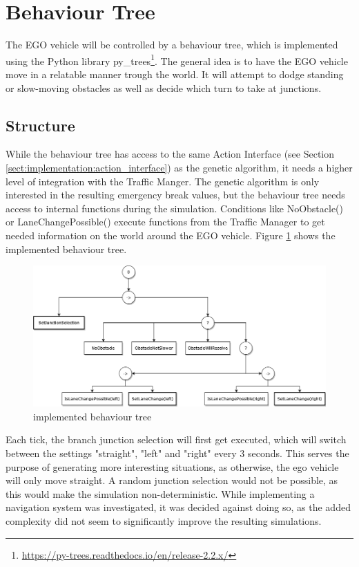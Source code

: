 \section{Behaviour Tree}
The EGO vehicle will be controlled by a behaviour tree, which is implemented using the Python library py\_trees\footnote{\href{https://py-trees.readthedocs.io/en/release-2.2.x/}{https://py-trees.readthedocs.io/en/release-2.2.x/}}. The general idea is to have the EGO vehicle move in a relatable manner trough the world. It will attempt to dodge standing or slow-moving obstacles as well as decide which turn to take at junctions.

\subsection{Structure}
While the behaviour tree has access to the same Action Interface (see Section \ref{sect:implementation:action_interface}) as the genetic algorithm, it needs a higher level of integration with the Traffic Manger. The genetic algorithm is only interested in the resulting emergency break values, but the behaviour tree needs access to internal functions during the simulation. Conditions like NoObstacle() or LaneChangePossible() execute functions from the Traffic Manager to get needed information on the world around the EGO vehicle. Figure \ref{fig:implementation:bt} shows the implemented behaviour tree.

\begin{figure}[ht] 
	\includegraphics[width=1\linewidth]{figures/behaviorTree}
	\caption{implemented behaviour tree}
	\label{fig:implementation:bt}
\end{figure}

Each tick, the branch junction selection will first get executed, which will switch between the settings "straight", "left" and "right" every 3 seconds. This serves the purpose of generating more interesting situations, as otherwise, the ego vehicle will only move straight. A random junction selection would not be possible, as this would make the simulation non-deterministic. While implementing a navigation system was investigated, it was decided against doing so, as the added complexity did not seem to significantly improve the resulting simulations.

